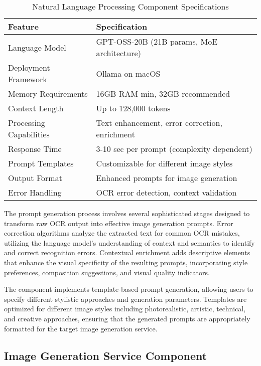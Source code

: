 \begin{table}[H]
\centering
\caption{Natural Language Processing Component Specifications}
\label{tab:nlp_specifications}
{\begin{tabular}{ll}
\toprule
\textbf{Feature} & \textbf{Specification} \\
\midrule
Language Model & GPT-OSS-20B (21B params, MoE architecture) \\
Deployment Framework & Ollama on macOS \\
Memory Requirements & 16GB RAM min, 32GB recommended \\
Context Length & Up to 128,000 tokens \\
Processing Capabilities & Text enhancement, error correction, enrichment \\
Response Time & 3-10 sec per prompt (complexity dependent) \\
Prompt Templates & Customizable for different image styles \\
Output Format & Enhanced prompts for image generation \\
Error Handling & OCR error detection, context validation \\
\bottomrule
\end{tabular}}
\end{table}

The prompt generation process involves several sophisticated stages designed to transform raw OCR output into effective image generation prompts. Error correction algorithms analyze the extracted text for common OCR mistakes, utilizing the language model's understanding of context and semantics to identify and correct recognition errors. Contextual enrichment adds descriptive elements that enhance the visual specificity of the resulting prompts, incorporating style preferences, composition suggestions, and visual quality indicators.

The component implements template-based prompt generation, allowing users to specify different stylistic approaches and generation parameters. Templates are optimized for different image styles including photorealistic, artistic, technical, and creative approaches, ensuring that the generated prompts are appropriately formatted for the target image generation service.

\subsection{Image Generation Service Component}

